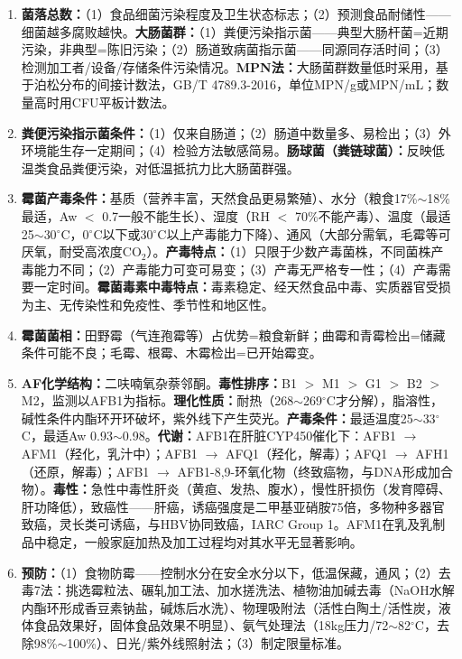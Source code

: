 {\begin{enumerate}[leftmargin=*, itemsep=6pt]
    \item \textbf{菌落总数：}（1）食品细菌污染程度及卫生状态标志；（2）预测食品耐储性——细菌越多腐败越快。\textbf{大肠菌群：}（1）粪便污染指示菌——典型大肠杆菌=近期污染，非典型=陈旧污染；（2）肠道致病菌指示菌——同源同存活时间；（3）检测加工者/设备/存储条件污染情况。\textbf{MPN法：}大肠菌群数量低时采用，基于泊松分布的间接计数法，GB/T 4789.3-2016，单位MPN/g或MPN/mL；数量高时用CFU平板计数法。

    \item \textbf{粪便污染指示菌条件：}（1）仅来自肠道；（2）肠道中数量多、易检出；（3）外环境能生存一定期间；（4）检验方法敏感简易。\textbf{肠球菌（粪链球菌）：}反映低温类食品粪便污染，对低温抵抗力比大肠菌群强。

    \item \textbf{霉菌产毒条件：}基质（营养丰富，天然食品更易繁殖）、水分（粮食17\%$\sim$18\%最适，Aw $<$ 0.7一般不能生长）、湿度（RH $<$ 70\%不能产毒）、温度（最适25$\sim$30$^\circ$C，0$^\circ$C以下或30$^\circ$C以上产毒能力下降）、通风（大部分需氧，毛霉等可厌氧，耐受高浓度CO$_2$）。\textbf{产毒特点：}（1）只限于少数产毒菌株，不同菌株产毒能力不同；（2）产毒能力可变可易变；（3）产毒无严格专一性；（4）产毒需要一定时间。\textbf{霉菌毒素中毒特点：}毒素稳定、经天然食品中毒、实质器官受损为主、无传染性和免疫性、季节性和地区性。

    \item \textbf{霉菌菌相：}田野霉（气连孢霉等）占优势=粮食新鲜；曲霉和青霉检出=储藏条件可能不良；毛霉、根霉、木霉检出=已开始霉变。

    \item \textbf{AF化学结构：}二呋喃氧杂萘邻酮。\textbf{毒性排序：}B1 $>$ M1 $>$ G1 $>$ B2 $>$ M2，监测以AFB1为指标。\textbf{理化性质：}耐热（268$\sim$269$^\circ$C才分解），脂溶性，碱性条件内酯环开环破坏，紫外线下产生荧光。\textbf{产毒条件：}最适温度25$\sim$33$^\circ$C，最适Aw 0.93$\sim$0.98。\textbf{代谢：}AFB1在肝脏CYP450催化下：AFB1 $\rightarrow$ AFM1（羟化，乳汁中）；AFB1 $\rightarrow$ AFQ1（羟化，解毒）；AFQ1 $\rightarrow$ AFH1（还原，解毒）；AFB1 $\rightarrow$ AFB1-8,9-环氧化物（终致癌物，与DNA形成加合物）。\textbf{毒性：}急性中毒性肝炎（黄疸、发热、腹水），慢性肝损伤（发育障碍、肝功降低），致癌性——肝癌，诱癌强度是二甲基亚硝胺75倍，多物种多器官致癌，灵长类可诱癌，与HBV协同致癌，IARC Group 1。AFM1在乳及乳制品中稳定，一般家庭加热及加工过程均对其水平无显著影响。

    \item \textbf{预防：}（1）食物防霉——控制水分在安全水分以下，低温保藏，通风；（2）去毒7法：挑选霉粒法、碾轧加工法、加水搓洗法、植物油加碱去毒（NaOH水解内酯环形成香豆素钠盐，碱炼后水洗）、物理吸附法（活性白陶土/活性炭，液体食品效果好，固体食品效果不明显）、氨气处理法（18kg压力/72$\sim$82$^\circ$C，去除98\%$\sim$100\%）、日光/紫外线照射法；（3）制定限量标准。


\end{enumerate}}
